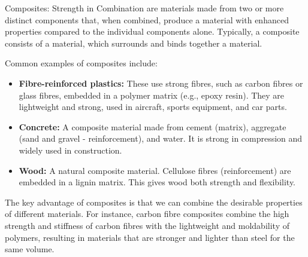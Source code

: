 \begin{keyconcept}{Composites: Strength in Combination}
 are materials made from two or more distinct components that, when combined, produce a material with enhanced properties compared to the individual components alone.  Typically, a composite consists of a  material, which surrounds and binds together a  material.

Common examples of composites include:

\begin{itemize}
    \item \textbf{Fibre-reinforced plastics:}  These use strong fibres, such as carbon fibres or glass fibres, embedded in a polymer matrix (e.g., epoxy resin).  They are lightweight and strong, used in aircraft, sports equipment, and car parts.
    \item \textbf{Concrete:} A composite material made from cement (matrix), aggregate (sand and gravel - reinforcement), and water.  It is strong in compression and widely used in construction.
    \item \textbf{Wood:}  A natural composite material. Cellulose fibres (reinforcement) are embedded in a lignin matrix. This gives wood both strength and flexibility.
\end{itemize}

The key advantage of composites is that we can combine the desirable properties of different materials. For instance, carbon fibre composites combine the high strength and stiffness of carbon fibres with the lightweight and moldability of polymers, resulting in materials that are stronger and lighter than steel for the same volume.
\end{keyconcept}

